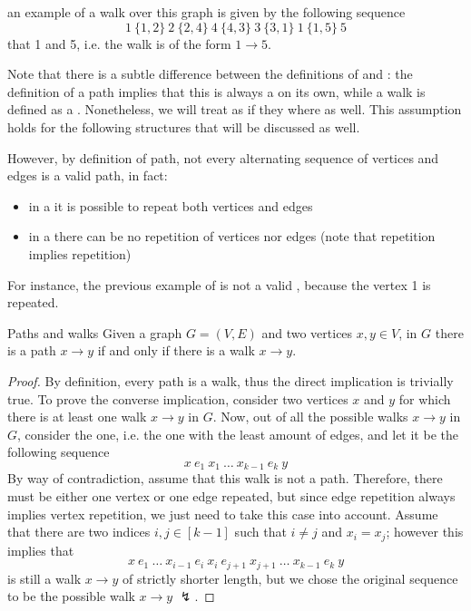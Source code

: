 \documentclass[a4paper, 12pt]{report}
\begin{document}
    an example of a walk over this graph is given by the following sequence $$1 \ \{1, 2\} \ 2 \ \{2, 4\} \ 4 \ \{4, 3\} \ 3 \ \{3, 1\} \ 1 \ \{1, 5\} \ 5$$ that  1 and 5, i.e. the walk is of the form $1 \to 5$.

    Note that there is a subtle difference between the definitions of  and : the definition of a path implies that this is always a  on its own, while a walk is defined as a . Nonetheless, we will treat  as if they where  as well. This assumption holds for the following structures that will be discussed as well.

    However, by definition of path, not every alternating sequence of vertices and edges is a valid path, in fact:
    
    \begin{itemize}
        \item in a  it is possible to repeat both vertices and edges
        \item in a  there can be no repetition of vertices nor edges (note that  repetition implies  repetition)
    \end{itemize}

    For instance, the previous example of  is not a valid , because the vertex 1 is repeated.

    \begin{framedthm}[label={paths and walks}]{Paths and walks}
        Given a graph $G = (V, E)$ and two vertices $x, y \in V$, in $G$ there is a path $x \to y$ if and only if there is a walk $x \to y$.
    \end{framedthm}

    \begin{proof}
        By definition, every path is a walk, thus the direct implication is trivially true. To prove the converse implication, consider two vertices $x$ and $y$ for which there is at least one walk $x \to y$ in $G$. Now, out of all the possible walks $x \to y$ in $G$, consider the  one, i.e. the one with the least amount of edges, and let it be the following sequence $$x \ e_1 \ x_1 \ \ldots \ x_{k - 1} \ e_k \ y $$ By way of contradiction, assume that this walk is not a path. Therefore, there must be either one vertex or one edge repeated, but since edge repetition always implies vertex repetition, we just need to take this case into account. Assume that there are two indices $i, j \in [k - 1]$ such that $i \neq j$ and $x_i = x_j$; however this implies that $$x \ e_1 \ \ldots \ x_{i - 1} \ e_i \ x_i \ e_{j + 1} \ x_{j + 1} \ \ldots \ x_{k - 1} \ e_k \ y$$ is still a walk $x \to y$ of strictly shorter length, but we chose the original sequence to be the  possible walk $x \to y$ $\lightning$.
    \end{proof}
\end{document}
